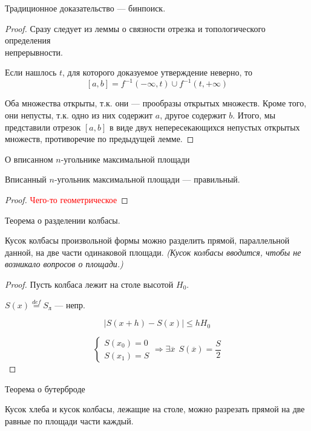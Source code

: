     Традиционное доказательство --- бинпоиск.
    \begin{proof}
        Сразу следует из леммы о связности отрезка и топологического определения\\непрерывности.

        Если нашлось $t$, для которого доказуемое утверждение неверно, то $$[a,b]=f^{-1}(-\infty, t)\cup f^{-1}(t, +\infty)$$

        Оба множества открыты, т.к. они --- прообразы открытых множеств. Кроме того, они непусты, т.к. одно из них содержит $a$, другое содержит $b$. Итого, мы представили отрезок $[a,b]$ в виде двух непересекающихся непустых открытых множеств, противоречие по предыдущей лемме.
    \end{proof}
    \begin{theorem}
        О вписанном $n$-угольнике максимальной площади
        
        Вписанный $n$-угольник максимальной площади --- правильный.
    \end{theorem}
    \begin{proof}
        \textcolor{red}{Чего-то геометрическое}
    \end{proof}
    \begin{theorem}
        Теорема о разделении колбасы.

        Кусок колбасы произвольной формы можно разделить прямой, параллельной данной, на две части одинаковой площади. \textit{(Кусок колбасы вводится, чтобы не возникало вопросов о площади.)}
    \end{theorem}
    \begin{proof}
        Пусть колбаса лежит на столе высотой $H_0$.

        $S(x)\stackrel{def}{=}S_{\text{л}}$ --- непр.

        $$|S(x+h)-S(x)|\leq hH_0$$

        $$\begin{cases}
            S(x_0)=0 \\
            S(x_1)=S
        \end{cases} \Rightarrow \exists \overline x \ \ S(\overline x)=\frac{S}{2}$$
    \end{proof}
    \begin{theorem}
        Теорема о бутерброде

        Кусок хлеба и кусок колбасы, лежащие на столе, можно разрезать прямой на две равные по площади части каждый.
    \end{theorem}
